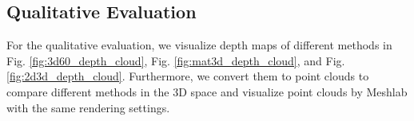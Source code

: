 \begin{table*} [ht]
	\begin{center}
		\caption{ Ablation studies on network encoder and different fusion strategies. }
		\label{tab:pipeline}
        \vspace{-0.5em}
        
		\addtolength{\tabcolsep}{-0.2pt}
	\end{center}
    \vspace{-2.5em}
\end{table*}


\subsection{Qualitative Evaluation}

For the qualitative evaluation, we visualize depth maps of different methods in Fig. \ref{fig:3d60_depth_cloud}, Fig. \ref{fig:mat3d_depth_cloud}, and Fig. \ref{fig:2d3d_depth_cloud}.
Furthermore, we convert them to point clouds to compare different methods in the 3D space and visualize point clouds by Meshlab \cite{meshlab} with the same rendering settings.



